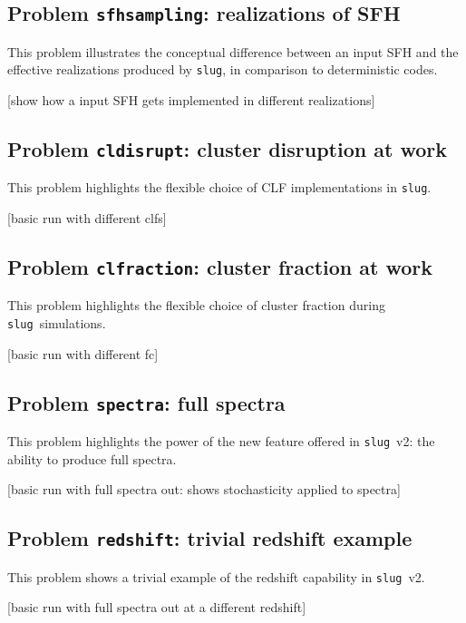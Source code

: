 \documentclass[12pt]{article}
\newcommand{\slug}{\texttt{slug}}
\begin{document}
\subsection{Problem {\tt sfhsampling}: realizations of SFH}

This problem illustrates the conceptual difference between an input SFH and the effective 
realizations produced by \slug, in comparison to deterministic codes.

[show how a input SFH gets implemented in different realizations]

\subsection{Problem {\tt cldisrupt}: cluster disruption at work}

This problem highlights the flexible choice of CLF implementations in \slug.

[basic run with different clfs]

\subsection{Problem {\tt clfraction}: cluster fraction at work}

This problem highlights the flexible choice of cluster fraction during \slug\ simulations.

[basic run with different fc]

\subsection{Problem {\tt spectra}: full spectra}

This problem highlights the power of the new feature offered in \slug\ v2: the ability to produce 
full spectra. 

[basic run with full spectra out: shows stochasticity applied to spectra]

\subsection{Problem {\tt redshift}: trivial redshift example}

This problem shows a trivial example of the redshift capability in \slug\ v2.

[basic run with full spectra out at a different redshift]
\end{document}

